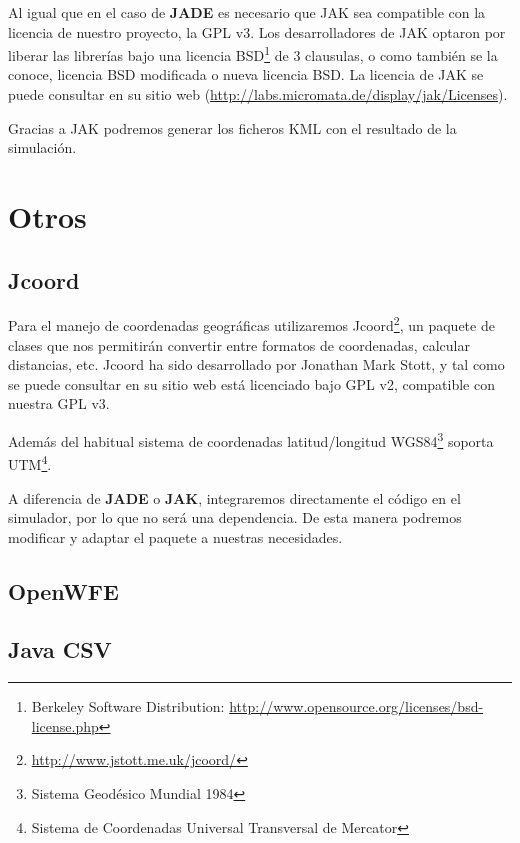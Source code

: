 
Al igual que en el caso de {\bf JADE} es necesario que JAK sea compatible con
la licencia de nuestro proyecto, la GPL v3. %
Los desarrolladores de JAK optaron por liberar las librerías bajo una licencia
BSD\footnote{Berkeley Software Distribution:
\url{http://www.opensource.org/licenses/bsd-license.php}} de 3 clausulas, o como
también se la conoce, licencia BSD modificada o nueva licencia BSD. La licencia
de JAK se puede consultar en su sitio web
(\url{http://labs.micromata.de/display/jak/Licenses}).

Gracias a JAK podremos generar los ficheros KML con el resultado de la
simulación.

\section*{Otros}


\subsection*{Jcoord}

Para el manejo de coordenadas geográficas utilizaremos
Jcoord\footnote{\url{http://www.jstott.me.uk/jcoord/}}, un paquete de clases que
nos permitirán convertir entre formatos de coordenadas, calcular distancias,
etc. Jcoord ha sido desarrollado por Jonathan Mark Stott, y tal como se puede
consultar en su sitio web está licenciado bajo GPL v2, compatible con nuestra
GPL v3. %

Además del habitual sistema de coordenadas latitud/longitud
WGS84\footnote{Sistema Geodésico Mundial 1984} soporta UTM\footnote{Sistema de
Coordenadas Universal Transversal de Mercator}.

A diferencia de {\bf JADE} o {\bf JAK}, integraremos directamente el código en
el simulador, por lo que no será una dependencia. De esta manera podremos
modificar y adaptar el paquete a nuestras necesidades.

\subsection*{OpenWFE}

\subsection*{Java CSV}